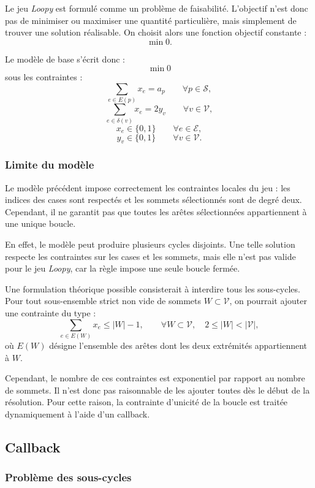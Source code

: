 Le jeu \textit{Loopy} est formulé comme un problème de faisabilité. L'objectif n'est donc pas de minimiser ou maximiser une quantité particulière, mais simplement de trouver une solution réalisable. On choisit alors une fonction objectif constante :
\[
\min 0.
\]

Le modèle de base s'écrit donc :
\[
\min 0
\]
sous les contraintes :
\[
\sum_{e \in E(p)} x_e = a_p
\qquad \forall p \in \mathcal{S},
\]
\[
\sum_{e \in \delta(v)} x_e = 2y_v
\qquad \forall v \in \mathcal{V},
\]
\[
x_e \in \{0,1\}
\qquad \forall e \in \mathcal{E},
\]
\[
y_v \in \{0,1\}
\qquad \forall v \in \mathcal{V}.
\]

\subsubsection{Limite du modèle}

Le modèle précédent impose correctement les contraintes locales du jeu : les indices des cases sont respectés et les sommets sélectionnés sont de degré deux. Cependant, il ne garantit pas que toutes les arêtes sélectionnées appartiennent à une unique boucle.

En effet, le modèle peut produire plusieurs cycles disjoints. Une telle solution respecte les contraintes sur les cases et les sommets, mais elle n'est pas valide pour le jeu \textit{Loopy}, car la règle impose une seule boucle fermée.

Une formulation théorique possible consisterait à interdire tous les sous-cycles. Pour tout sous-ensemble strict non vide de sommets \(W \subset \mathcal{V}\), on pourrait ajouter une contrainte du type :
\[
\sum_{e \in E(W)} x_e \leq |W| - 1,
\qquad
\forall W \subset \mathcal{V}, \quad 2 \leq |W| < |\mathcal{V}|,
\]
où \(E(W)\) désigne l'ensemble des arêtes dont les deux extrémités appartiennent à \(W\).

Cependant, le nombre de ces contraintes est exponentiel par rapport au nombre de sommets. Il n'est donc pas raisonnable de les ajouter toutes dès le début de la résolution. Pour cette raison, la contrainte d'unicité de la boucle est traitée dynamiquement à l'aide d'un callback.

\subsection{Callback}

\subsubsection{Problème des sous-cycles}

